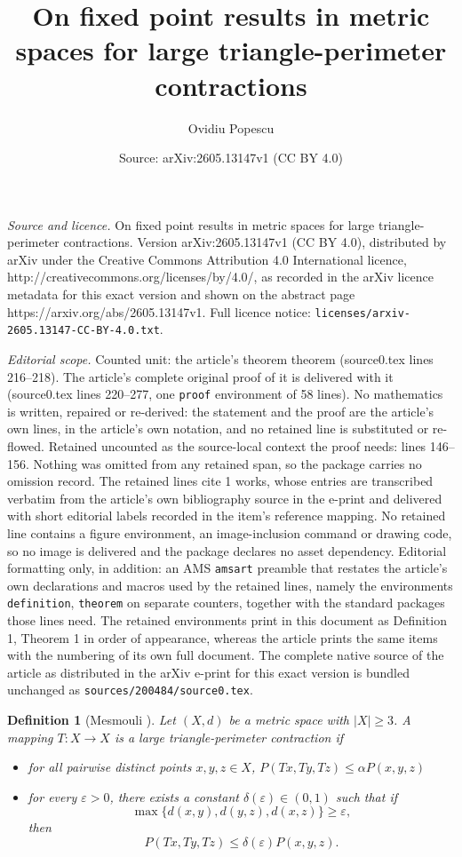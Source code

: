 \documentclass[10pt,a4paper]{amsart}
\title{On fixed point results in metric spaces for large triangle-perimeter contractions}
\author{Ovidiu Popescu}
\date{Source: arXiv:2605.13147v1 (CC BY 4.0)}
\newtheorem{definition}{Definition}
\begin{document}
\maketitle

\noindent\emph{Source and licence.} On fixed point results in metric spaces for large triangle-perimeter contractions. Version arXiv:2605.13147v1 (CC BY 4.0), distributed by arXiv under the Creative Commons Attribution 4.0 International licence, http://creativecommons.org/licenses/by/4.0/, as recorded in the arXiv licence metadata for this exact version and shown on the abstract page https://arxiv.org/abs/2605.13147v1. Full licence notice: \texttt{licenses/arxiv-2605.13147-CC-BY-4.0.txt}.\par\smallskip

\noindent\textit{Editorial scope.} Counted unit: the article's theorem theorem (source0.tex lines 216--218). The article's complete original proof of it is delivered with it (source0.tex lines 220--277, one \texttt{proof} environment of 58 lines). No mathematics is written, repaired or re-derived: the statement and the proof are the article's own lines, in the article's own notation, and no retained line is substituted or re-flowed.  Retained uncounted as the source-local context the proof needs: lines 146--156.  Nothing was omitted from any retained span, so the package carries no omission record.  The retained lines cite 1 works, whose entries are transcribed verbatim from the article's own bibliography source in the e-print and delivered with short editorial labels recorded in the item's reference mapping.  No retained line contains a figure environment, an image-inclusion command or drawing code, so no image is delivered and the package declares no asset dependency.  Editorial formatting only, in addition: an AMS \texttt{amsart} preamble that restates the article's own declarations and macros used by the retained lines, namely the environments \texttt{definition}, \texttt{theorem} on separate counters, together with the standard packages those lines need.  The retained environments print in this document as Definition 1, Theorem 1 in order of appearance, whereas the article prints the same items with the numbering of its own full document.  The complete native source of the article as distributed in the arXiv e-print for this exact version is bundled unchanged as \texttt{sources/200484/source0.tex}.
	\begin{definition}[Mesmouli \cite{Mesmouli}]
		Let $(X,d)$ be a metric space with  $|X|\geq 3$. A mapping $T \colon X\to X$ is a large triangle-perimeter contraction if 
		\begin{itemize}
			\item[(i)] for all pairwise distinct points $x,y,z \in X$, \(P(Tx,Ty,Tz) \leq \alpha P(x,y,z)\)
			\item[(ii)] for every \(\varepsilon > 0\), there exists a constant \(\delta(\varepsilon) \in (0,1)\) such that if
			\[\max\{d(x,y), d(y,z), d(x,z)\} \geq \varepsilon, \]
			then 
			\[P(Tx,Ty,Tz) \leq \delta(\varepsilon)  P(x,y,z). \]
		\end{itemize} 
	\label{largeP}
	\end{definition}
\end{document}
